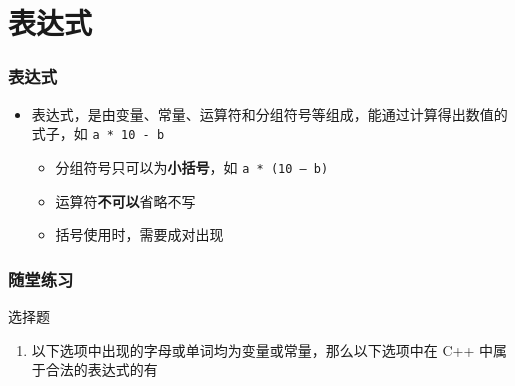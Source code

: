 \section{表达式}

\begin{frame}[fragile]
    \frametitle{表达式}

    \begin{itemize}[<+->]
        \item 表达式，是由变量、常量、运算符和分组符号等组成，能通过计算得出数值的式子，如 \lstinline|a * 10 - b|

            \begin{itemize}
                \item 分组符号只可以为\textbf{小括号}，如 \lstinline|a * (10 – b)|
                \item 运算符\textbf{不可以}省略不写
                \item 括号使用时，需要成对出现
            \end{itemize}

    \end{itemize}
\end{frame}

\begin{frame}[fragile]
    \frametitle{随堂练习}

    \begin{exampleblock}{选择题}

        \begin{enumerate}
            \item 以下选项中出现的字母或单词均为变量或常量，那么以下选项中在 C++ 中属于合法的表达式的有


        \end{enumerate}

    \end{exampleblock}
\end{frame}


